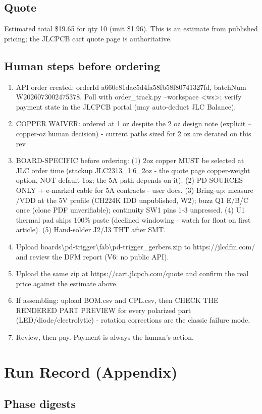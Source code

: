 \documentclass[11pt,a4paper]{article}
\begin{document}
\subsection*{Quote}
Estimated total \$19.65 for qty 10 (unit \$1.96). This is an estimate from published pricing; the JLCPCB cart quote page is authoritative.
\subsection*{Human steps before ordering}
\begin{enumerate}
\item API order created: orderId a660e81dac5d4fa58fb58f80741327fd, batchNum W2026073002475378. Poll with order\_track.py --workspace \textless{}ws\textgreater{}; verify payment state in the JLCPCB portal (may auto-deduct JLC Balance).
\item COPPER WAIVER: ordered at 1 oz despite the 2 oz design note (explicit --copper-oz human decision) - current paths sized for 2 oz are derated on this rev
\item BOARD-SPECIFIC before ordering: (1) 2oz copper MUST be selected at JLC order time (stackup JLC2313\_1.6\_2oz - the quote page copper-weight option, NOT default 1oz; the 5A path depends on it). (2) PD SOURCES ONLY + e-marked cable for 5A contracts - user docs. (3) Bring-up: measure /VDD at the 5V profile (CH224K IDD unpublished, W2); buzz Q1 E/B/C once (clone PDF unverifiable); continuity SW1 pins 1-3 unpressed. (4) U1 thermal pad ships 100\% paste (declined windowing - watch for float on first article). (5) Hand-solder J2/J3 THT after SMT.
\item Upload boards\textbackslash{}pd-trigger\textbackslash{}fab\textbackslash{}pd-trigger\_gerbers.zip to https://jlcdfm.com/ and review the DFM report (V6: no public API).
\item Upload the same zip at https://cart.jlcpcb.com/quote and confirm the real price against the estimate above.
\item If assembling: upload BOM.csv and CPL.csv, then CHECK THE RENDERED PART PREVIEW for every polarized part (LED/diode/electrolytic) - rotation corrections are the classic failure mode.
\item Review, then pay. Payment is always the human's action.
\end{enumerate}
\section{Run Record (Appendix)}
\subsection*{Phase digests}
\end{document}
